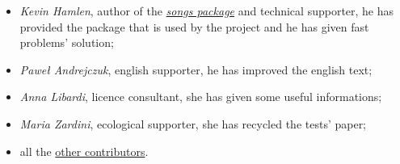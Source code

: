 \begin{itemize}
	\item {\textit{\rmfamily Kevin Hamlen}}, author of the \href{http://songs.sourceforge.net/}{\textit{songs package}} and technical supporter, he has provided the package that is used by the project and he has given fast problems' solution;
	\item {\textit{\rmfamily Paweł Andrejczuk}}, english supporter, he has improved the english text;
	\item {\textit{\rmfamily Anna Libardi}}, licence consultant, she has given some useful informations;
	\item {\textit{\rmfamily Maria Zardini}}, ecological supporter, she has recycled the tests' paper;
  \item all the \href{https://github.com/PietroPrandini/GuitarHub/graphs/contributors}{other contributors}.
\end{itemize}
